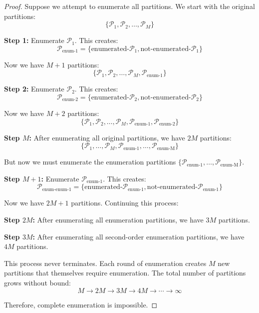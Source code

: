 \documentclass[twocolumn,10pt]{article}
\theoremstyle{definition}
\theoremstyle{remark}
\begin{document}
\begin{proof}
Suppose we attempt to enumerate all partitions. We start with the original partitions:
\begin{equation}
\{\mathcal{P}_1, \mathcal{P}_2, \ldots, \mathcal{P}_M\}
\end{equation}

\textbf{Step 1:} Enumerate $\mathcal{P}_1$. This creates:
\begin{equation}
\mathcal{P}_{\text{enum-1}} = \{\text{enumerated-}\mathcal{P}_1, \text{not-enumerated-}\mathcal{P}_1\}
\end{equation}

Now we have $M + 1$ partitions:
\begin{equation}
\{\mathcal{P}_1, \mathcal{P}_2, \ldots, \mathcal{P}_M, \mathcal{P}_{\text{enum-1}}\}
\end{equation}

\textbf{Step 2:} Enumerate $\mathcal{P}_2$. This creates:
\begin{equation}
\mathcal{P}_{\text{enum-2}} = \{\text{enumerated-}\mathcal{P}_2, \text{not-enumerated-}\mathcal{P}_2\}
\end{equation}

Now we have $M + 2$ partitions:
\begin{equation}
\{\mathcal{P}_1, \mathcal{P}_2, \ldots, \mathcal{P}_M, \mathcal{P}_{\text{enum-1}}, \mathcal{P}_{\text{enum-2}}\}
\end{equation}

\textbf{Step $M$:} After enumerating all original partitions, we have $2M$ partitions:
\begin{equation}
\{\mathcal{P}_1, \ldots, \mathcal{P}_M, \mathcal{P}_{\text{enum-1}}, \ldots, \mathcal{P}_{\text{enum-M}}\}
\end{equation}

But now we must enumerate the enumeration partitions $\{\mathcal{P}_{\text{enum-1}}, \ldots, \mathcal{P}_{\text{enum-M}}\}$.

\textbf{Step $M+1$:} Enumerate $\mathcal{P}_{\text{enum-1}}$. This creates:
\begin{equation}
\mathcal{P}_{\text{enum-enum-1}} = \{\text{enumerated-}\mathcal{P}_{\text{enum-1}}, \text{not-enumerated-}\mathcal{P}_{\text{enum-1}}\}
\end{equation}

Now we have $2M + 1$ partitions. Continuing this process:

\textbf{Step $2M$:} After enumerating all enumeration partitions, we have $3M$ partitions.

\textbf{Step $3M$:} After enumerating all second-order enumeration partitions, we have $4M$ partitions.

This process never terminates. Each round of enumeration creates $M$ new partitions that themselves require enumeration. The total number of partitions grows without bound:
\begin{equation}
M \to 2M \to 3M \to 4M \to \cdots \to \infty
\end{equation}

Therefore, complete enumeration is impossible.
\end{proof}
\end{document}

